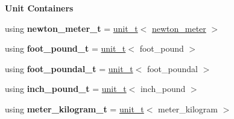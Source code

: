 \begin{Indent}{\bf Unit Containers}\par
{\em \label{namespaceunits_1_1torque_torqueContainers}%
\hypertarget{namespaceunits_1_1torque_torqueContainers}{}%
}\begin{DoxyCompactItemize}
\item 
\hypertarget{namespaceunits_1_1torque_a416a64cad0ea812a0cc8a2fa15f36320}{}using {\bfseries newton\+\_\+meter\+\_\+t} = \hyperlink{classunits_1_1unit__t}{unit\+\_\+t}$<$ \hyperlink{structunits_1_1unit}{newton\+\_\+meter} $>$\label{namespaceunits_1_1torque_a416a64cad0ea812a0cc8a2fa15f36320}

\item 
\hypertarget{namespaceunits_1_1torque_a686276f6bb4cea5287769c5eeaf9b73b}{}using {\bfseries foot\+\_\+pound\+\_\+t} = \hyperlink{classunits_1_1unit__t}{unit\+\_\+t}$<$ foot\+\_\+pound $>$\label{namespaceunits_1_1torque_a686276f6bb4cea5287769c5eeaf9b73b}

\item 
\hypertarget{namespaceunits_1_1torque_a55cd00fee7e7735a2bd641fc67de4869}{}using {\bfseries foot\+\_\+poundal\+\_\+t} = \hyperlink{classunits_1_1unit__t}{unit\+\_\+t}$<$ foot\+\_\+poundal $>$\label{namespaceunits_1_1torque_a55cd00fee7e7735a2bd641fc67de4869}

\item 
\hypertarget{namespaceunits_1_1torque_ae40a6905bc122385fbdfb2deed42466d}{}using {\bfseries inch\+\_\+pound\+\_\+t} = \hyperlink{classunits_1_1unit__t}{unit\+\_\+t}$<$ inch\+\_\+pound $>$\label{namespaceunits_1_1torque_ae40a6905bc122385fbdfb2deed42466d}

\item 
\hypertarget{namespaceunits_1_1torque_a9adb7661ac9d1e500afdb3d39c3c5df1}{}using {\bfseries meter\+\_\+kilogram\+\_\+t} = \hyperlink{classunits_1_1unit__t}{unit\+\_\+t}$<$ meter\+\_\+kilogram $>$\label{namespaceunits_1_1torque_a9adb7661ac9d1e500afdb3d39c3c5df1}

\end{DoxyCompactItemize}
\end{Indent}
